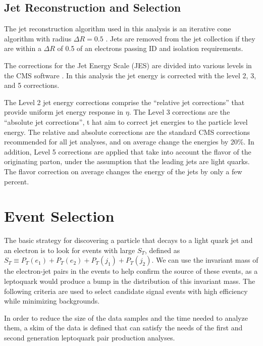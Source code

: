 \documentclass{cmspaper}
\begin{document}
\begin{linenumbers}
\subsection{Jet Reconstruction and Selection} \label{sec:jet}

The jet reconstruction algorithm used in this analysis is an 
iterative cone algorithm with radius $\Delta R=0.5$ \cite{JetAlg}.
Jets are removed   
from the jet collection if they are 
within a $\Delta R$ of 0.5 of an
electrons passing ID and isolation requirements.

The corrections for the Jet Energy Scale (JES) 
are divided into various levels in the CMS software \cite{JES}.  
In this analysis the jet energy is corrected with the 
level 2, 3, and 5 corrections.

The Level 2 jet energy corrections comprise the 
``relative jet corrections'' that provide 
uniform jet energy response in $\eta$.  
The Level 3 corrections are the ``absolute jet corrections'', t
hat aim to correct jet energies to the particle level energy. 
The relative and absolute corrections are the standard CMS 
corrections recommended for all jet analyses,
and on average change the energies by 20\%.
In addition, Level 5 corrections are applied that take into
account the flavor of the originating parton, under the assumption that the
leading jets are light quarks.
The flavor correction on average changes the energy of the jets by 
only a few percent.

\section{Event Selection} \label{sec:eventSelection}
The basic strategy for discovering a 
particle that decays to a light quark jet and an electron 
is to look for events with large $S_T$, defined as
$S_T\equiv P_T(e_1)+P_T(e_2)+P_T(j_1)+P_T(j_2)$.
We can use
the invariant mass of the electron-jet pairs in the events to help
confirm the source of these events, as a leptoquark would produce 
a bump in the distribution of this invariant mass.
The following criteria are used to select candidate signal events
with high efficiency
while minimizing backgrounds.


In order to reduce the size of the data samples and the time 
needed to analyze them, a skim of the 
data is defined
that can satisfy the needs of the
first and second generation leptoquark pair production analyses.


\end{linenumbers}
\end{document}

